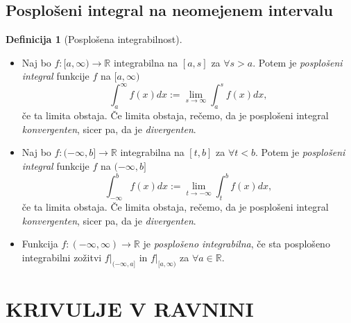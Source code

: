 \documentclass[11pt]{article}
\theoremstyle{definition}
\newtheorem{definicija}{Definicija}[section]
\theoremstyle{definition}
\theoremstyle{definition}
\theoremstyle{theorem}
\begin{document}

\subsection{Posplošeni integral na neomejenem intervalu}
\vspace{0.5cm}

\begin{definicija}[Posplošena integrabilnost]
	\begin{itemize}
		\item Naj bo $f:[a, \infty) \rightarrow \mathbb{R}$ integrabilna na $[a, s]$ za $\forall s > a$. Potem je \textit{posplošeni integral} funkcije $f$ na $[a, \infty)$
		$$\int_{a}^{\infty} f(x) dx := \lim_{s \rightarrow \infty} \int_{a}^{s} f(x) dx,$$
		če ta limita obstaja. Če limita obstaja, rečemo, da je posplošeni integral \textit{konvergenten}, sicer pa, da je \textit{divergenten}. \\
		\item Naj bo $f:(-\infty, b] \rightarrow \mathbb{R}$ integrabilna na $[t, b]$ za $\forall t < b$. Potem je \textit{posplošeni integral} funkcije $f$ na $(-\infty, b]$
		$$\int_{-\infty}^{b} f(x) dx := \lim_{t \rightarrow -\infty} \int_{t}^{b} f(x) dx,$$
		če ta limita obstaja. Če limita obstaja, rečemo, da je posplošeni integral \textit{konvergenten}, sicer pa, da je \textit{divergenten}. \\
		\item Funkcija $f:(-\infty, \infty) \rightarrow \mathbb{R}$ je \textit{posplošeno integrabilna}, če sta posplošeno integrabilni zožitvi $f |_{(-\infty, a]}$ in $f |_{[a, \infty)}$ za $\forall a \in \mathbb{R}$. 
	\end{itemize}
\end{definicija}
\vspace{0.5cm}


\pagebreak


\section{KRIVULJE V RAVNINI}
\vspace{0.5cm}
\end{document}
